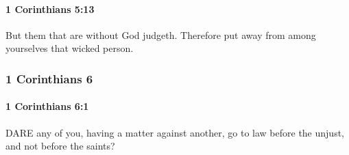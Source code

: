 		\paragraph{1 Corinthians 5:13} %
			\label{1CORINTHIANS-5-13}

			But them that are without God judgeth. Therefore put away from among yourselves that wicked person.

			\begin{framed}
			\scriptsize
				\begin{compactdesc}
					\item[SBLG] 
				\end{compactdesc}
			\end{framed}

	\subsubsection{1 Corinthians 6} %
		\label{1CORINTHIANS-6}
		
		\paragraph{1 Corinthians 6:1} %
			\label{1CORINTHIANS-6-1}

			DARE any of you, having a matter against another, go to law before the unjust, and not before the saints?

